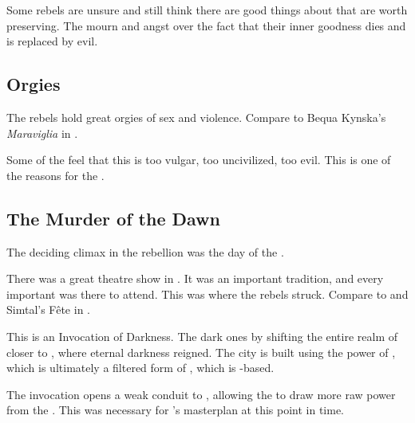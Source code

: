 Some rebels are unsure and still think there are good things about \Merkyrah{} that are worth preserving. 
The mourn and angst over the fact that their inner goodness dies and is replaced by evil. 










\subsection{Orgies}
The rebels hold great orgies of sex and violence. 
Compare to Bequa Kynska's \emph{Maraviglia} in . 

Some of the \CiriathSepher{} feel that this is too vulgar, too uncivilized, too evil. 
This is one of the reasons for the . 









\subsection{The Murder of the Dawn}
The deciding climax in the rebellion was the day of the . 

There was a great theatre show in \Merkyrah.
It was an important tradition, and every important \resphan was there to attend. 
This was where the rebels struck. 
Compare to \cite{EdgarAllanPoe:TheConquerorWorm} and Simtal's F\^ete in \cite{StevenErikson:GardensoftheMoon}.

This is an Invocation of \Erebean{} Darkness. 
The dark ones  by shifting the entire realm of \Nyx closer to \Erebos, where eternal darkness reigned. 
The city is built using the power of , which is ultimately a filtered form of \nieur, which is \Nyx-based.

The invocation opens a weak conduit to \Erebos, allowing the \resphain to draw more raw power from the \banes.
This was necessary for \Daggerrain's masterplan at this point in time.


